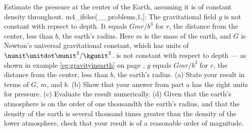 Estimate the pressure at the center of the Earth,
assuming it is of constant density throughout. 
m4_ifelse(__problems,1,[:%
The gravitational field $g$ is not constant with repsect to
depth. It equals $Gmr/b^3$ for $r$, the distance from the center,
less than $b$, the earth's radius. Here $m$ is the mass of the earth, and
$G$ is Newton's universal gravitational constant, which has units
of $\nunit\unitdot\munit^2/\kgunit^2$.%
is not constant with respect to depth --- as shown in
example \ref{eg:gravityinearth} on page \pageref{eg:gravityinearth},
$g$ equals $Gmr/b^3$ for $r$, the distance from the center,
less than $b$, the earth's radius.%
\hwendpart
(a) State your result in terms of $G$, $m$, and $b$.\answercheck\hwendpart
(b) Show that your answer from part a has the right units for pressure.\hwendpart
(c) Evaluate the result numerically. \answercheck \hwendpart
(d) Given that the earth's atmosphere is on the order of
 one thousandth the earth's radius, and that the density
of the earth is several thousand times greater than the density of the
lower atmosphere, check that your result is of a reasonable order of
magnitude.

